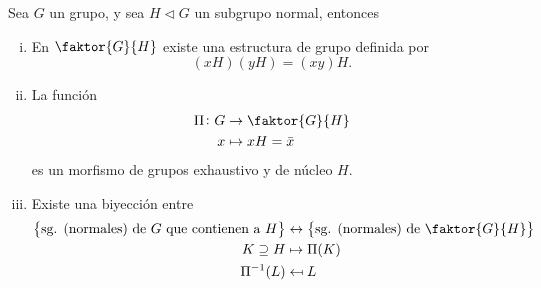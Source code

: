\begin{prop}\label{prop:normalbiyec}
    Sea $G$ un grupo, y sea $H \triangleleft G$ un subgrupo normal, entonces
    \begin{enumerate}[i)]
        \item En $\faktor{G}{H}$ existe una estructura de grupo definida por 
            \[
                (xH)(yH) = (xy)H.
            \]
        \item La función
            \[
                \begin{aligned}
                    \Pi \colon G &\to  \faktor{G}{H} \\
                    x &\mapsto xH = \bar{x}
                \end{aligned}
            \]
            es un morfismo de grupos exhaustivo y de núcleo $H$.
        \item Existe una biyección entre
            \[
                \begin{aligned}
                    \setb{ \text{sg. (normales) de $G$ que contienen a $H$}} &\leftrightarrow
                    \setb{ \text{sg. (normales) de $\faktor{G}{H}$}} \\
                    K \supseteq H &\mapsto \Pi(K) \\
                    \Pi^{-1}(L) &\mapsfrom L
                \end{aligned}
            \]
    \end{enumerate}
\end{prop}

